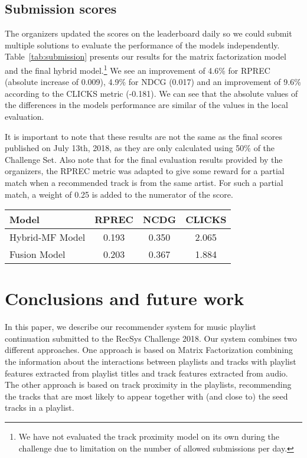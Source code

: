 \subsection{Submission scores}

The organizers updated the scores on the leaderboard daily so we could submit multiple solutions to evaluate the performance of the models independently. 
Table~\ref{tab:submission} presents our results for the matrix factorization model and the final hybrid model.\footnote{We have not evaluated the track proximity model on its own during the challenge due to limitation on the number of allowed submissions per day.}  We see an improvement of 4.6\% for RPREC (absolute increase of 0.009), 4.9\% for NDCG (0.017) and an improvement of 9.6\% according to the CLICKS metric (-0.181). We can see that the absolute values of the differences in the models performance are similar of the values in the local evaluation.


It is important to note that these results are not the same as the final scores published on July 13th, 2018, as they are only calculated using 50\% of the Challenge Set. Also note that for the final evaluation results provided by the organizers, the RPREC metric was adapted to give some reward for a partial match when a recommended track is from the same artist. For such a partial match, a weight of 0.25 is added to the numerator of the score. 


\begin{table*}
  \caption{Scores of the submitted models during the challenge.}
  \label{tab:submission}
  \begin{tabular}{lccc}
    \toprule
    Model&RPREC&NCDG&CLICKS\\
    \midrule
    Hybrid-MF Model&0.193&0.350&2.065\\
    Fusion Model&0.203&0.367&1.884\\
  \bottomrule
\end{tabular}
\end{table*}




\section{Conclusions and future work}
In this paper, we describe our recommender system for music playlist continuation submitted to the RecSys Challenge 2018. Our system combines two different approaches. One approach is based on Matrix Factorization combining the information about the interactions between playlists and tracks with playlist features extracted from playlist titles and track features extracted from audio. The other approach is based on track proximity in the playlists, recommending the tracks that are most likely to appear together with (and close to) the seed tracks in a playlist.

